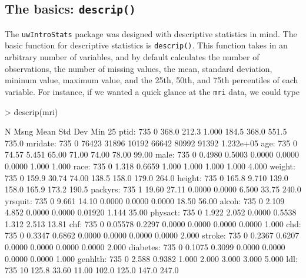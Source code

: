 \documentclass[landscape]{article}
\renewenvironment{Schunk}{\vspace{\topsep}}{\vspace{\topsep}}
\begin{document}
\subsection{The basics: \texttt{descrip()}}
The \texttt{uwIntroStats} package was designed with descriptive statistics in mind. The basic function for descriptive statistics is \texttt{descrip()}. This function takes in an arbitrary number of variables, and by default calculates the number of observations, the number of missing values, the mean, standard deviation, mininum value, maximum value, and the 25th, 50th, and 75th percentiles of each variable. For instance, if we wanted a quick glance at the \texttt{mri} data, we could type
\begin{Schunk}
\begin{Sinput}
> descrip(mri)
\end{Sinput}
\begin{Soutput}
            N     Msng  Mean      Std Dev    Min       25%
    ptid:     735     0   368.0     212.3     1.000     184.5     368.0     551.5      735.0  
 mridate:     735     0   76423     31896     10192     66642     80992     91392    1.232e+05
     age:     735     0   74.57     5.451     65.00     71.00     74.00     78.00      99.00  
    male:     735     0   0.4980    0.5003    0.0000    0.0000    0.0000    1.000      1.000  
    race:     735     0   1.318     0.6659    1.000     1.000     1.000     1.000      4.000  
  weight:     735     0   159.9     30.74     74.00     138.5     158.0     179.0      264.0  
  height:     735     0   165.8     9.710     139.0     158.0     165.9     173.2      190.5  
 packyrs:     735     1   19.60     27.11     0.0000    0.0000    6.500     33.75      240.0  
 yrsquit:     735     0   9.661     14.10     0.0000    0.0000    0.0000    18.50      56.00  
   alcoh:     735     0   2.109     4.852     0.0000    0.0000   0.01920    1.144      35.00  
 physact:     735     0   1.922     2.052     0.0000    0.5538    1.312     2.513      13.81  
     chf:     735     0  0.05578    0.2297    0.0000    0.0000    0.0000    0.0000     1.000  
     chd:     735     0   0.3347    0.6862    0.0000    0.0000    0.0000    0.0000     2.000  
  stroke:     735     0   0.2367    0.6207    0.0000    0.0000    0.0000    0.0000     2.000  
diabetes:     735     0   0.1075    0.3099    0.0000    0.0000    0.0000    0.0000     1.000  
 genhlth:     735     0   2.588     0.9382    1.000     2.000     3.000     3.000      5.000  
     ldl:     735    10   125.8     33.60     11.00     102.0     125.0     147.0      247.0  

\end{Soutput}
\end{Schunk}
\end{document}
